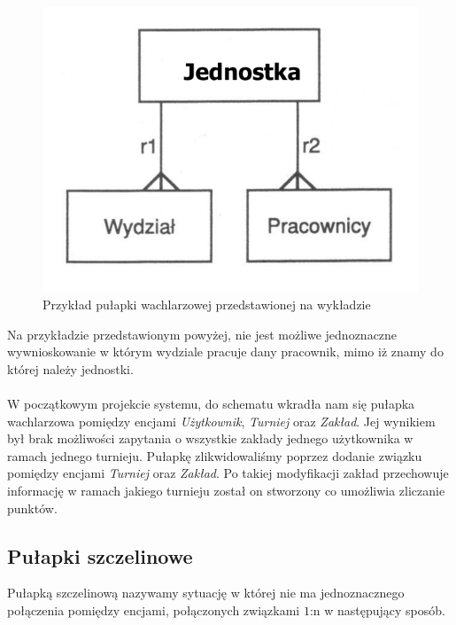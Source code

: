 \documentclass{mwrep}[15pt]
\begin{document}
\begin{figure}[H]
	\centering
	\includegraphics[scale=0.4]{./wachlarz.png}
	\caption{Przykład pułapki wachlarzowej przedstawionej na wykładzie\cite{Kowalczyk1}}
\end{figure}

Na przykładzie przedstawionym powyżej, nie jest możliwe jednoznaczne wywnioskowanie w którym wydziale pracuje dany pracownik, mimo iż znamy 
do której należy jednostki. \\
\\
\indent W początkowym projekcie systemu, do schematu wkradła nam się pułapka wachlarzowa pomiędzy encjami \emph{Użytkownik}, \emph{Turniej} oraz \emph{Zakład}.
Jej wynikiem był brak możliwości zapytania o wszystkie zakłady jednego użytkownika w ramach jednego turnieju. Pułapkę zlikwidowaliśmy
poprzez dodanie związku pomiędzy encjami \emph{Turniej} oraz \emph{Zakład}. Po takiej modyfikacji zakład przechowuje informację w ramach jakiego turnieju został on stworzony
co umożliwia zliczanie punktów.
\newpage
\subsection{Pułapki szczelinowe}
Pułapką szczelinową nazywamy sytuację w której nie ma jednoznacznego połączenia pomiędzy encjami, połączonych związkami $1$:n w następujący sposób.
\end{document}
